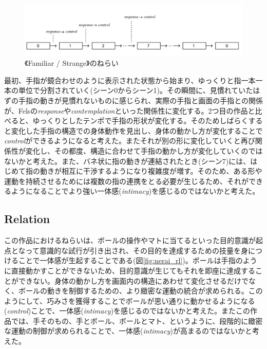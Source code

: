 \begin{figure}[H]
  \centering
  \includegraphics[width=15cm]{img/nerai_fs.png}
  \caption{《Familiar / Strange》のねらい}
  \label{fig:nerai_fs}
\end{figure}

最初、手指が鏡合わせのように表示された状態から始まり、ゆっくりと指一本一本の単位で分割されていく(シーン0からシーン1)。その瞬間に、見慣れていたはずの手指の動きが見慣れないものに感じられ、実際の手指と画面の手指との関係が、Felsの\textit{response}や\textit{contemplation}といった関係性に変化する。2つ目の作品と比べると、ゆっくりとしたテンポで手指の形状が変化する。そのためしばらくすると変化した手指の構造での身体動作を見出し、身体の動かし方が変化することで\textit{control}ができるようになると考えた。またそれが別の形に変化していくと再び関係性が変化し、その都度、構造に合わせて手指の動かし方が変化していくのではないかと考えた。また、バネ状に指の動きが連結されたとき(シーン7)には、はじめて指の動きが相互に干渉するようになり複雑度が増す。そのため、ある形や運動を持続させるためには複数の指の連携をとる必要が生じるため、それができるようになることでより強い一体感(\textit{intimacy})を感じるのではないかと考えた。

\subsection*{Relation}
この作品におけるねらいは、ボールの操作やマトに当てるといった目的意識が起点となって意識的な試行が引き出され、その目的を達成するための技量を身につけることで一体感が生起することである(図\ref{fig:nerai_rl})。ボールは手指のように直接動かすことができないため、目的意識が生じてもそれを即座に達成することができない。身体の動かし方を画面内の構造にあわせて変化させるだけでなく、ボールの動きを制御するための、より緻密な運動の統合が求められる。このようにして、巧みさを獲得することでボールが思い通りに動かせるようになる(\textit{control})ことで、一体感(\textit{intimacy})を感じるのではないかと考えた。またこの作品では、手そのもの、手とボール、ボールとマト、というように、段階的に緻密な運動の制御が求められることで、一体感(\textit{intimacy})が高まるのではないかと考えた。

